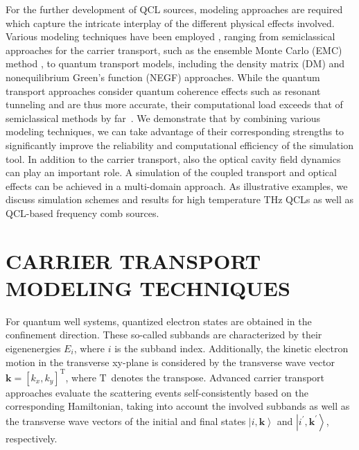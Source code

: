 \documentclass[a4paper]{spie}%
\begin{document}
For the further development of QCL sources, modeling approaches are required
which capture the intricate interplay of the different physical effects
involved. Various modeling techniques have been employed
\cite{jirauschek2014modeling}, ranging from semiclassical approaches for the
carrier transport, such as the ensemble Monte Carlo (EMC) method
\cite{2000ApPhL..76.2265I,2004ApPhL..84..645C,2006ApPhL..88f1119L,2007JAP...101f3101G,2009JAP...105l3102J,2005JAP....97d3702B,ezhov2016influence}%
, to quantum transport models, including the density matrix (DM)
\cite{2001PhRvL..87n6603I,2009PhRvB..79p5322W,iotti2016electronic,lindskog2014comparative}
and nonequilibrium Green's function (NEGF)
\cite{2002PhRvB..66h5326W,2009PhRvB..79s5323K,2009ApPhL..95w1111S,Kubis_assess,Kolek_openQCL,Wacker_JSTQE,grange2015contrasting}
approaches. While the quantum transport approaches consider quantum coherence
effects such as resonant tunneling and are thus more accurate, their
computational load exceeds that of semiclassical methods by
far~\cite{2010PhyE...42.2628M}. We demonstrate that by combining various
modeling techniques, we can take advantage of their corresponding strengths to
significantly improve the reliability and computational efficiency of the
simulation tool. In addition to the carrier transport, also the optical cavity
field dynamics can play an important role. A simulation of the coupled
transport and optical effects can be achieved in a multi-domain approach. As
illustrative examples, we discuss simulation schemes and results for high
temperature THz QCLs as well as QCL-based frequency comb sources.

\section{CARRIER TRANSPORT MODELING TECHNIQUES}

\label{sec:carr}

For quantum well systems, quantized electron states are obtained in the
confinement direction. These so-called subbands are characterized by their
eigenenergies $E_{i}$, where $i$ is the subband index. Additionally, the
kinetic electron motion in the transverse xy-plane is considered by the
transverse wave vector $\mathbf{k}=[k_{x},k_{y}]^{\mathrm{T}}$, where
$\mathrm{T}$\ denotes the transpose. Advanced carrier transport approaches
evaluate the scattering events self-consistently based on the corresponding
Hamiltonian, taking into account the involved subbands as well as the
transverse wave vectors of the initial and final states $\left|
i,\mathbf{k}\right\rangle $ and $\left|  i^{\prime},\mathbf{k}^{\prime
}\right\rangle $, respectively.
\end{document}
